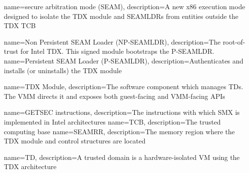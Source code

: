 {
    name=secure arbitration mode (SEAM),
    description={A new x86 execution mode designed to isolate the TDX module and SEAMLDRs from entities outside the TDX TCB}
}

{
    name=Non Persistent SEAM Loader (NP-SEAMLDR),
    description={The root-of-trust for Intel TDX. This signed module bootstraps the P-SEAMLDR.}
}
{
    name=Persistent SEAM Loader (P-SEAMLDR),
    description={Authenticates and installs (or uninstalls) the TDX module}
}

{
    name=TDX Module,
    description={The software component which manages TDs. The VMM directs it and exposes both guest-facing and VMM-facing APIs}
}

{
    name=GETSEC instructions,
    description={The instructions with which SMX is implemented in Intel architectures}
}
{
    name=TCB,
    description={The trusted computing base}
}
{
    name=SEAMRR,
    description={The memory region where the TDX module and control structures are located}
}

{
    name=TD,
    description={A trusted domain is a hardware-isolated VM using the TDX architecture}
}